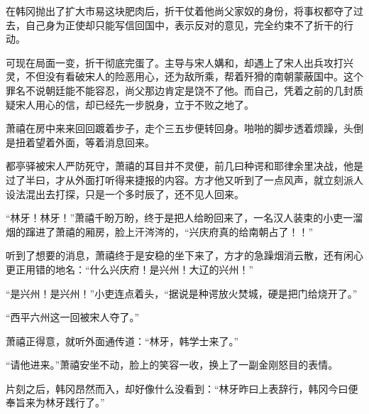 在韩冈抛出了扩大市易这块肥肉后，折干仗着他尚父家奴的身份，将事权都夺了过去，自己身为正使却只能写信回国中，表示反对的意见，完全约束不了折干的行动。

可现在局面一变，折干彻底完蛋了。主导与宋人媾和，却遇上了宋人出兵攻打兴灵，不但没有看破宋人的险恶用心，还为敌所乘，帮着歼猾的南朝蒙蔽国中。这个罪名不说朝廷能不能容忍，尚父那边肯定是饶不了他。而自己，凭着之前的几封质疑宋人用心的信，却已经先一步脱身，立于不败之地了。

萧禧在房中来来回回踱着步子，走个三五步便转回身。啪啪的脚步透着烦躁，头倒是扭着望着外面，等着消息回来。

都亭驿被宋人严防死守，萧禧的耳目并不灵便，前几曰种谔和耶律余里决战，他是过了半曰，才从外面打听得来捷报的内容。方才他又听到了一点风声，就立刻派人设法混出去打探，只是一个多时辰了，还不见人回来。

“林牙！林牙！”萧禧千盼万盼，终于是把人给盼回来了，一名汉人装束的小吏一溜烟的蹿进了萧禧的厢房，脸上汗涔涔的，“兴庆府真的给南朝占了！！”

听到了想要的消息，萧禧终于是安稳的坐下来了，方才的急躁烟消云散，还有闲心更正用错的地名：“什么兴庆府！是兴州！大辽的兴州！”

“是兴州！是兴州！”小吏连点着头，“据说是种谔放火焚城，硬是把门给烧开了。”

“西平六州这一回被宋人夺了。”

萧禧正得意，就听外面通传道：“林牙，韩学士来了。”

“请他进来。”萧禧安坐不动，脸上的笑容一收，换上了一副金刚怒目的表情。

片刻之后，韩冈昂然而入，却好像什么没看到：“林牙昨曰上表辞行，韩冈今曰便奉旨来为林牙践行了。”
